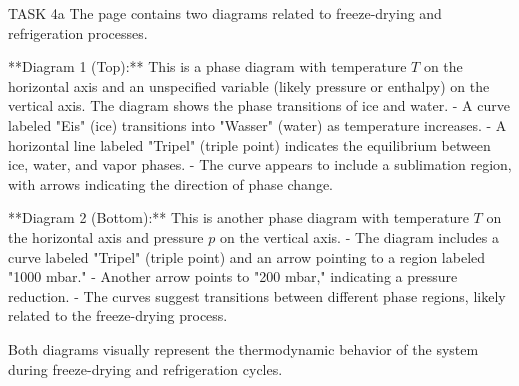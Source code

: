 TASK 4a  
The page contains two diagrams related to freeze-drying and refrigeration processes.  

**Diagram 1 (Top):**  
This is a phase diagram with temperature \( T \) on the horizontal axis and an unspecified variable (likely pressure or enthalpy) on the vertical axis. The diagram shows the phase transitions of ice and water.  
- A curve labeled "Eis" (ice) transitions into "Wasser" (water) as temperature increases.  
- A horizontal line labeled "Tripel" (triple point) indicates the equilibrium between ice, water, and vapor phases.  
- The curve appears to include a sublimation region, with arrows indicating the direction of phase change.  

**Diagram 2 (Bottom):**  
This is another phase diagram with temperature \( T \) on the horizontal axis and pressure \( p \) on the vertical axis.  
- The diagram includes a curve labeled "Tripel" (triple point) and an arrow pointing to a region labeled "1000 mbar."  
- Another arrow points to "200 mbar," indicating a pressure reduction.  
- The curves suggest transitions between different phase regions, likely related to the freeze-drying process.  

Both diagrams visually represent the thermodynamic behavior of the system during freeze-drying and refrigeration cycles.